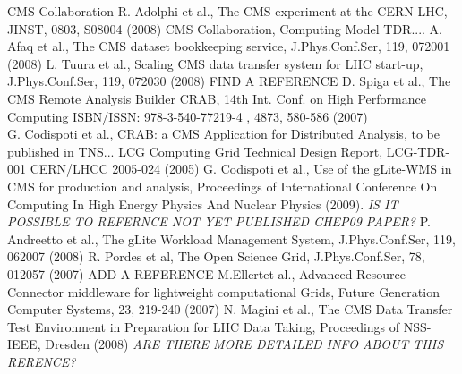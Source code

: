 \begin{thebibliography}{}
%
%
CMS Collaboration R. Adolphi et al., The CMS experiment at the CERN LHC, JINST, 0803, S08004 (2008)
%
CMS Collaboration, Computing Model TDR....
%
A. Afaq et al., The CMS dataset bookkeeping service, J.Phys.Conf.Ser, 119, 072001 (2008)
%
L. Tuura et al., Scaling CMS data transfer system for LHC start-up, J.Phys.Conf.Ser, 119, 072030 (2008)
%
FIND A REFERENCE
%
D. Spiga et al., The CMS Remote Analysis Builder CRAB, 14th Int. Conf. on High Performance Computing ISBN/ISSN: 978-3-540-77219-4 , 4873, 580-586 (2007)\\
G. Codispoti et al., CRAB: a CMS Application for Distributed Analysis, to be published in TNS...
%
LCG Computing Grid Technical Design Report, LCG-TDR-001 CERN/LHCC 2005-024 (2005)
%
G. Codispoti et al., Use of the gLite-WMS in CMS for production and analysis, Proceedings of International Conference On Computing In High Energy Physics And Nuclear Physics (2009). \emph{IS IT POSSIBLE TO REFERNCE NOT YET PUBLISHED CHEP09 PAPER?}
%
 P. Andreetto et al., The gLite Workload Management System, J.Phys.Conf.Ser, 119, 062007 (2008)
%
 R. Pordes et al, The Open Science Grid, J.Phys.Conf.Ser, 78, 012057 (2007)
 ADD A REFERENCE
%
 M.Ellertet al., Advanced Resource Connector middleware
  for lightweight computational Grids, Future Generation Computer Systems, 23, 219-240 (2007)
%
 N. Magini et al., The CMS Data Transfer Test Environment in Preparation for LHC Data Taking, Proceedings of NSS-IEEE, Dresden (2008)  \emph{ARE THERE MORE DETAILED INFO ABOUT THIS RERENCE?}
\end{thebibliography}



